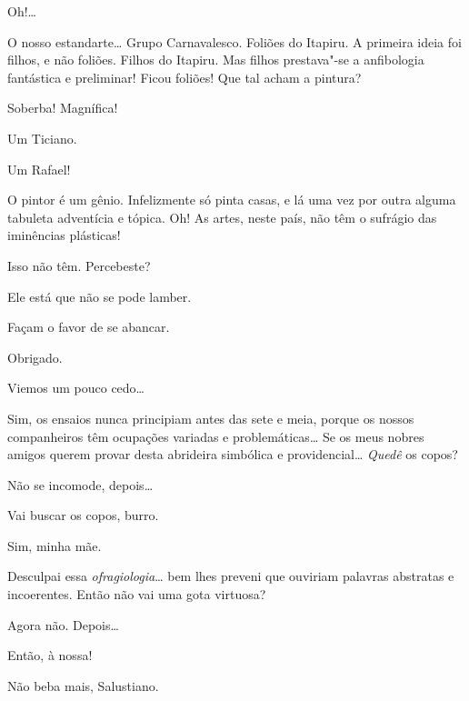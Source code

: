   
Oh!\ldots

 O nosso
estandarte\ldots{}  Grupo
Carnavalesco. Foliões do Itapiru. A primeira ideia foi
filhos, e não foliões. Filhos do Itapiru. Mas filhos
prestava"-se a anfibologia fantástica e preliminar!
Ficou foliões! Que tal acham a pintura?

 Soberba! Magnífica!

 Um Ticiano.

 Um Rafael!

 O pintor é um
gênio. Infelizmente só pinta casas, e lá uma vez por outra
alguma tabuleta adventícia e tópica.  Oh! As artes, neste
país, não têm o sufrágio das iminências
plásticas!

 Isso não
têm.  Percebeste?

 
Ele está que não se pode lamber.

 
Façam o favor de se abancar.

 Obrigado. 

 Viemos um pouco cedo\ldots

 Sim, os ensaios
nunca principiam antes das sete e meia, porque os nossos companheiros
têm ocupações variadas e problemáticas\ldots{} 
Se os meus nobres amigos querem provar desta abrideira
simbólica e providencial\ldots{}  \textit{Quedê} os copos?

 Não se incomode, depois\ldots

 Vai buscar os
copos, burro.

 Sim, minha
mãe. 

 Desculpai essa
\textit{ofragiologia}\ldots{} bem lhes preveni que ouviriam
palavras abstratas e incoerentes. 
Então não vai uma gota virtuosa?

 Agora não. Depois\ldots

 Então, à nossa!

 Não beba mais,
Salustiano.


